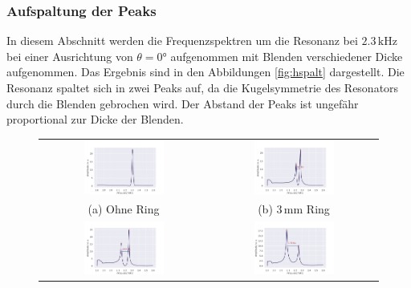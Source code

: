 \subsubsection{Aufspaltung der Peaks}
In diesem Abschnitt werden die Frequenzspektren um die Resonanz bei $2.3 \,\si{\kilo\hertz}$ bei einer Ausrichtung von $\theta = 0°$ aufgenommen mit Blenden verschiedener Dicke aufgenommen. Das Ergebnis sind in den Abbildungen \ref{fig:hspalt} dargestellt. 
Die Resonanz spaltet sich in zwei Peaks auf, da die Kugelsymmetrie des Resonators durch die Blenden gebrochen wird. Der Abstand der Peaks ist ungefähr proportional zur Dicke der Blenden.
\begin{figure}[H]
  \centering
  \begin{tabular}{cc}
    \includegraphics[width=0.5\textwidth]{Daten/Wasserstoff/spalt0.pdf} &   \includegraphics[width=0.5\textwidth]{Daten/Wasserstoff/spalt1.pdf} \\
  (a) Ohne Ring & (b) $3 \,\si{\milli\metre}$ Ring \\[6pt]
  \includegraphics[width=0.5\textwidth]{Daten/Wasserstoff/spalt2.pdf} &   \includegraphics[width=0.5\textwidth]{Daten/Wasserstoff/spalt3.pdf} \\

\end{tabular}
\end{figure}
